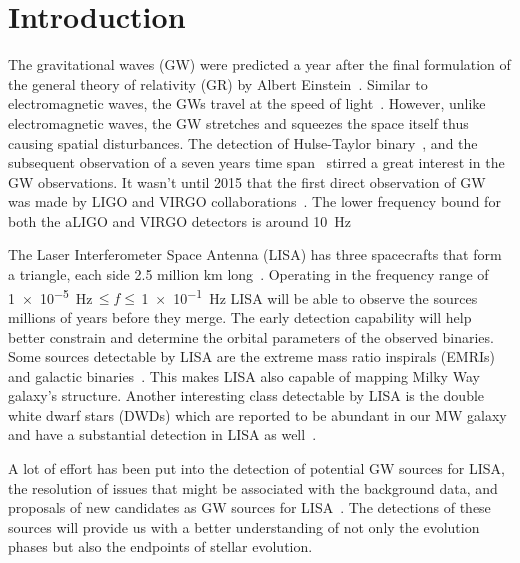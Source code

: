 \documentclass[twocolumn, twocolappendix]{aastex63}
\begin{document}


    \section{Introduction} \label{sec:intro}
    The gravitational waves (GW) were predicted a year after the final formulation of the general theory of relativity (GR) by Albert Einstein~\citep{Einstein1916}.
    Similar to electromagnetic waves, the GWs travel at the speed of light~\citep{Eddington1922, Abott2016}.
    However, unlike electromagnetic waves, the GW stretches and squeezes the space itself thus causing spatial disturbances.
    The detection of Hulse-Taylor binary~\citep{Hulse1975}, and the subsequent observation of a seven years time span~\citep{Taylor1982} stirred a great interest in the GW observations.
    It wasn't until 2015 that the first direct observation of GW was made by LIGO and VIRGO collaborations~\citep{Abott2016}.
    The lower frequency bound for both the aLIGO and VIRGO detectors is around \SI{10}{\hertz}~\citep{aLIGO2015, aVIRGO2014}

    The Laser Interferometer Space Antenna (LISA) has three spacecrafts that form a triangle, each side 2.5 million km long~\citep{Prince2002, Robson2019}.
    Operating in the frequency range of \SI{1e-5}{\hertz}$\,\leq  f \leq\,$\SI{1e-1}{\hertz} LISA will be able to observe the sources millions of years before they merge.
    The early detection capability will help better constrain and determine the orbital parameters of the observed binaries.
    Some sources detectable by LISA are the extreme mass ratio inspirals (EMRIs)~\citep{Klein2016, Gair2017, Chapman2022} and galactic binaries~\citep{Abott2016, Wagg2021, Digman2022}.
    This makes LISA also capable of mapping Milky Way galaxy's structure.
    Another interesting class detectable by LISA is the double white dwarf stars (DWDs) which are reported to be abundant in our MW galaxy and have a substantial detection in LISA as well~\citep{Nelemans2001, Willems2007, Ruiter2010, Korol2017}.

    A lot of effort has been put into the detection of potential GW sources for LISA, the resolution of issues that might be associated with the background data, and proposals of new candidates as GW sources for LISA~\citep[see, for example,][]{Nelemans2001, Babak2008, Sesana2009, Babak2010, Belczynski2010, Blaut2010, Ruiter2010, Yu2010, Guo2017, Khakhaleva2020, Lau2020, Broekgaarden2021, Shao2021, Renzo2021, Andrews2020, Fumagalli2022, Wagg2021}.
    The detections of these sources will provide us with a better understanding of not only the evolution phases but also the endpoints of stellar evolution.
\end{document}
